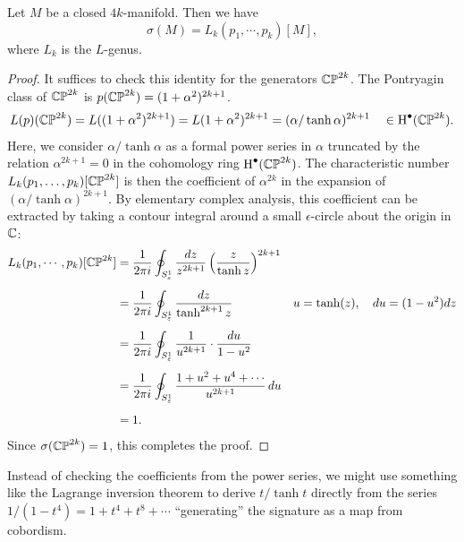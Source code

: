 \begin{theorem}[Hirzebruch]\label{thm:hirzebruch-signature-theorem}
	Let $M$ be a closed $4k$-manifold. Then we have
	\[
		\sigma(M) = L_k(p_1, \cdots, p_k)[M],
	\]
	where $L_k$ is the $L$-genus.
\end{theorem}
\begin{proof}
	It suffices to check this identity for the generators $\mathbb{CP}^{2k}$. The Pontryagin class of $\mathbb{CP}^{2k}$ is $p(\mathbb{CP}^{2k})=(1+\alpha^2)^{2k+1}$.
	\[
		\begin{aligned}
			L(p)(\mathbb{CP}^{2k})
			= L((1+\alpha^2)^{2k+1})
			= L(1+\alpha^2)^{2k+1}
			= (\alpha/\tanh \alpha)^{2k+1}
			\quad\in\operatorname{H}^\bullet(\mathbb{CP}^{2k}).
		\end{aligned}
	\]
	Here, we consider $\alpha/\tanh \alpha$ as a formal power series in $\alpha$ truncated by the relation $\alpha^{2k+1}=0$ in the cohomology ring $\operatorname{H}^\bullet(\mathbb{CP}^{2k})$. The characteristic number $L_k(p_1,\ldots,p_k)[\mathbb{CP}^{2k}]$ is then the coefficient of $\alpha^{2k}$ in the expansion of $(\alpha/\tanh \alpha)^{2k+1}$.
	By elementary complex analysis, this coefficient can be extracted by taking a contour integral around a small $\epsilon$-circle about the origin in $\mathbb{C}$:
	\[
		\begin{aligned}
			L_k(p_1,\cdots, p_k)[\mathbb{CP}^{2k}]
			 & = \frac{1}{2\pi i}\oint_{S^1_\varepsilon} \frac{dz}{z^{2k+1}} \left(\frac{z}{\tanh z}\right)^{2k+1}
			 &                                                                                                    \\[0.5em]
			 & = \frac{1}{2\pi i}\oint_{S^1_\varepsilon} \frac{dz}{\tanh^{2k+1} z}\quad
			 & u  =\tanh(z),\quad
			du =(1-u^2)dz
			\\[0.5em]
			 & = \frac{1}{2\pi i}\oint_{S^1_\varepsilon} \frac{1}{u^{2k+1}}\cdot\frac{du}{1-u^2}
			 &                                                                                                    \\[0.5em]
			 & = \frac{1}{2\pi i}\oint_{S^1_\varepsilon} \frac{1+u^2+u^4+\cdots}{u^{2k+1}}\,du                       \\[0.5em]
			 & =1.                                                                                              &
		\end{aligned}
	\]
	Since $\sigma(\mathbb{CP}^{2k})=1$, this completes the proof.
\end{proof}

\begin{remark}
	Instead of checking the coefficients from the power series, we might use something like the Lagrange inversion theorem to derive $t/\tanh t$ directly from the series $1/(1-t^4)=1+t^4+t^8+\cdots$ ``generating'' the signature as a map from cobordism. 
\end{remark}

